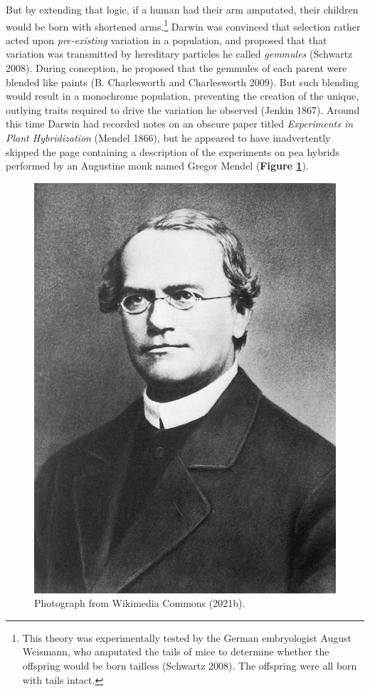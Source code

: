 \documentclass[
]{book}
\begin{document}
But by extending that logic, if a human had their arm amputated, their children would be born with shortened arms.\footnote{This theory was experimentally tested by the German embryologist August Weismann, who amputated the tails of mice to determine whether the offspring would be born tailless (Schwartz 2008). The offspring were all born with tails intact.} Darwin was convinced that selection rather acted upon \emph{pre-existing} variation in a population, and proposed that that variation was transmitted by hereditary particles he called \emph{gemmules} (Schwartz 2008). During conception, he proposed that the gemmules of each parent were blended like paints (B. Charlesworth and Charlesworth 2009). But such blending would result in a monochrome population, preventing the creation of the unique, outlying traits required to drive the variation he observed (Jenkin 1867). Around this time Darwin had recorded notes on an obscure paper titled \emph{Experiments in Plant Hybridization} (Mendel 1866), but he appeared to have inadvertently skipped the page containing a description of the experiments on pea hybrids performed by an Augustine monk named Gregor Mendel (\textbf{Figure \ref{fig:mendel}}).



\begin{figure}

{\centering \includegraphics[width=0.6\linewidth]{figs/introduction/Gregor_Mendel_2} 

}

\caption{Photograph from Wikimedia Commons (2021b).}\label{fig:mendel}
\end{figure}
\end{document}
